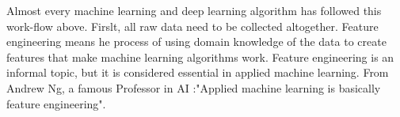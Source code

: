 \documentclass[english]{article}
\begin{document}
Almost every machine learning and deep learning algorithm has followed this work-flow above. Firslt, all raw data need to be collected altogether. Feature engineering means he process of using domain knowledge of the data to create features that make machine learning algorithms work. Feature engineering is an informal topic, but it is considered essential in applied machine learning\cite{feature}. From Andrew Ng, a famous Professor in AI :"Applied machine learning is basically feature engineering".


\begin{figure}[H]
\centering



\begin{tikzpicture}[x=0.75pt,y=0.75pt,yscale=-0.8,xscale=0.8]


\end{tikzpicture}
\end{figure}
\end{document}
